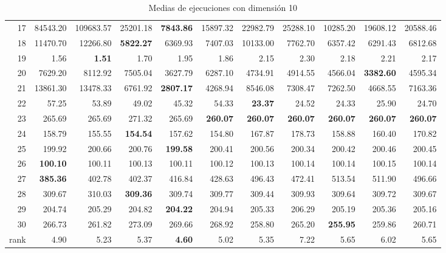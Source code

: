 \begin{table}[h!]
\begin{tabular}{rrrrrrrrrrr}
  17 & 84543.20 & 109683.57 & 25201.18 & \textbf{7843.86} & 15897.32 & 22982.79 & 25288.10 & 10285.20 & 19608.12 & 20588.46 \\ 
  18 & 11470.70 & 12266.80 & \textbf{5822.27} & 6369.93 & 7407.03 & 10133.00 & 7762.70 & 6357.42 & 6291.43 & 6812.68 \\ 
  19 & 1.56 & \textbf{1.51} & 1.70 & 1.95 & 1.86 & 2.15 & 2.30 & 2.18 & 2.21 & 2.17 \\ 
  20 & 7629.20 & 8112.92 & 7505.04 & 3627.79 & 6287.10 & 4734.91 & 4914.55 & 4566.04 & \textbf{3382.60} & 4595.34 \\ 
  21 & 13861.30 & 13478.33 & 6761.92 & \textbf{2807.17} & 4268.94 & 8546.08 & 7308.47 & 7262.50 & 4668.55 & 7163.36 \\ 
  22 & 57.25 & 53.89 & 49.02 & 45.32 & 54.33 & \textbf{23.37} & 24.52 & 24.33 & 25.90 & 24.70 \\ 
  23 & 265.69 & 265.69 & 271.32 & 265.69 & \textbf{260.07} & \textbf{260.07} & \textbf{260.07} & \textbf{260.07} & \textbf{260.07} & \textbf{260.07} \\ 
  24 & 158.79 & 155.55 & \textbf{154.54} & 157.62 & 154.80 & 167.87 & 178.73 & 158.88 & 160.40 & 170.82 \\ 
  25 & 199.92 & 200.66 & 200.76 & \textbf{199.58} & 200.41 & 200.56 & 200.34 & 200.42 & 200.46 & 200.45 \\ 
  26 & \textbf{100.10} & 100.11 & 100.13 & 100.11 & 100.12 & 100.13 & 100.14 & 100.14 & 100.15 & 100.14 \\ 
  27 & \textbf{385.36} & 402.78 & 402.37 & 416.84 & 428.63 & 496.43 & 472.41 & 513.54 & 511.90 & 496.66 \\ 
  28 & 309.67 & 310.03 & \textbf{309.36} & 309.74 & 309.77 & 309.44 & 309.93 & 309.64 & 309.72 & 309.67 \\ 
  29 & 204.74 & 205.29 & 204.82 & \textbf{204.22} & 204.94 & 205.33 & 206.29 & 205.19 & 205.36 & 205.16 \\ 
  30 & 266.73 & 261.82 & 273.09 & 269.66 & 268.92 & 258.80 & 265.20 & \textbf{255.95} & 259.86 & 260.71 \\ 
  rank & 4.90 & 5.23 & 5.37 & \textbf{4.60} & 5.02 & 5.35 & 7.22 & 5.65 & 6.02 & 5.65 \\ 
   \hline
\end{tabular}
\endgroup
\caption{Medias de ejecuciones con dimensión 10} 
\label{d10}
\end{table}
